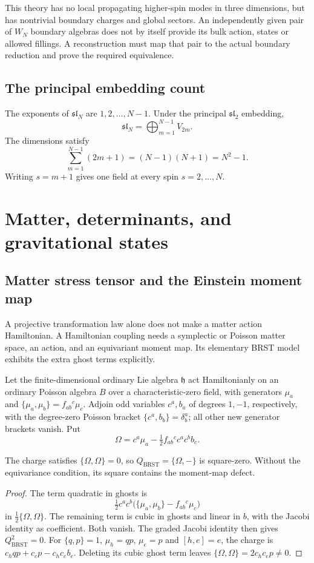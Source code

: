 This theory has no local propagating higher-spin modes in three dimensions,
but has nontrivial boundary charges and global sectors. An independently
given pair of $W_N$ boundary algebras does not by itself provide its bulk
action, states or allowed fillings. A reconstruction must map that pair
to the actual boundary reduction and prove the required equivalence.

\section{The principal embedding count}
The exponents of $\mathfrak{sl}_N$ are $1,2,\ldots,N-1$.  Under the principal $\mathfrak{sl}_2$ embedding,
\[
 \mathfrak{sl}_N=\bigoplus_{m=1}^{N-1}V_{2m}.
\]
The dimensions satisfy
\[
 \sum_{m=1}^{N-1}(2m+1)
 =(N-1)(N+1)=N^2-1.
\]
Writing $s=m+1$ gives one field at every spin $s=2,\ldots,N$.

\chapter{Matter, determinants, and gravitational states}

\section{Matter stress tensor and the Einstein moment map}
A projective transformation law alone does not make a matter action
Hamiltonian. A Hamiltonian coupling needs a symplectic or Poisson matter
space, an action, and an equivariant moment map. Its elementary BRST model
exhibits the extra ghost terms explicitly.

Let the finite-dimensional ordinary Lie algebra $\mathfrak h$ act
Hamiltonianly on an ordinary Poisson algebra $B$ over a characteristic-zero
field, with
generators $\mu_a$ and $\{\mu_a,\mu_b\}=f_{ab}{}^c\mu_c$.
Adjoin odd variables $c^a,b_a$ of degrees $1,-1$, respectively, with the
degree-zero Poisson bracket $\{c^a,b_b\}=\delta^a_b$; all other
new generator brackets vanish. Put
\[
 \Omega=c^a\mu_a-\tfrac12 f_{ab}{}^c c^a c^b b_c.
\]

\begin{proposition}
The charge satisfies $\{\Omega,\Omega\}=0$, so
$Q_{\mathrm{BRST}}=\{\Omega,-\}$ is square-zero. Without the equivariance
condition, its square contains the moment-map defect.
\end{proposition}
\begin{proof}
The term quadratic in ghosts is
\[
 \tfrac12c^ac^b\bigl(\{\mu_a,\mu_b\}-f_{ab}{}^c\mu_c\bigr)
\]
in $\tfrac12\{\Omega,\Omega\}$. The remaining term is cubic in ghosts
and linear in $b$, with the Jacobi identity as coefficient. Both vanish.
The graded Jacobi identity then gives $Q_{\mathrm{BRST}}^2=0$.
For $\{q,p\}=1$, $\mu_h=qp$, $\mu_e=p$ and $[h,e]=e$, the charge is
$c_hqp+c_ep-c_hc_eb_e$. Deleting its cubic ghost term leaves
$\{\Omega,\Omega\}=2c_hc_ep\ne0$.
\end{proof}

